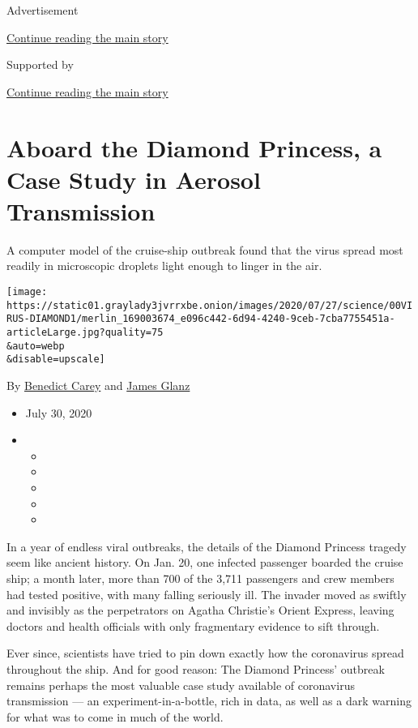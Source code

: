 Advertisement

\protect\hyperlink{after-top}{Continue reading the main story}

Supported by

\protect\hyperlink{after-sponsor}{Continue reading the main story}

\hypertarget{aboard-the-diamond-princess-a-case-study-in-aerosol-transmission}{%
\section{Aboard the Diamond Princess, a Case Study in Aerosol
Transmission}\label{aboard-the-diamond-princess-a-case-study-in-aerosol-transmission}}

A computer model of the cruise-ship outbreak found that the virus spread
most readily in microscopic droplets light enough to linger in the air.

\texttt{[image: https://static01.graylady3jvrrxbe.onion/images/2020/07/27/science/00VIRUS-DIAMOND1/merlin\_169003674\_e096c442-6d94-4240-9ceb-7cba7755451a-articleLarge.jpg?quality=75\\\&auto=webp\\\&disable=upscale]}

By \href{https://www.nytimes3xbfgragh.onion/by/benedict-carey}{Benedict
Carey} and
\href{https://www.nytimes3xbfgragh.onion/by/james-glanz}{James Glanz}

\begin{itemize}
\item
  July 30, 2020
\item
  \begin{itemize}
  \item
  \item
  \item
  \item
  \item
  \end{itemize}
\end{itemize}

In a year of endless viral outbreaks, the details of the Diamond
Princess tragedy seem like ancient history. On Jan. 20, one infected
passenger boarded the cruise ship; a month later, more than 700 of the
3,711 passengers and crew members had tested positive, with many falling
seriously ill. The invader moved as swiftly and invisibly as the
perpetrators on Agatha Christie's Orient Express, leaving doctors and
health officials with only fragmentary evidence to sift through.

Ever since, scientists have tried to pin down exactly how the
coronavirus spread throughout the ship. And for good reason: The Diamond
Princess' outbreak remains perhaps the most valuable case study
available of coronavirus transmission --- an experiment-in-a-bottle,
rich in data, as well as a dark warning for what was to come in much of
the world.

